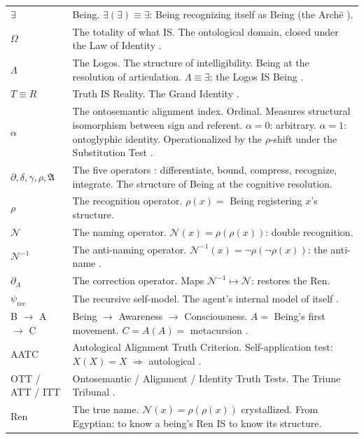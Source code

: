 \documentclass[11pt, oneside]{article}
\theoremstyle{definition}
\begin{document}
{\small
\noindent\begin{tabular}{@{} l @{\hspace{0.3em}} p{} @{}}
$\exists$ & Being. $\exists(\exists) \equiv \exists$: Being recognizing itself as Being (the Arch\={e} \cite{codex1}). \\[0.15em]
$\Omega$ & The totality of what IS. The ontological domain, closed under the Law of Identity \cite{codex1}. \\[0.15em]
$\Lambda$ & The Logos. The structure of intelligibility. Being at the resolution of articulation. $\Lambda \equiv \exists$: the Logos IS Being \cite{codex2}. \\[0.15em]
$T \equiv R$ & Truth IS Reality. The Grand Identity \cite{codex1}. \\[0.15em]
$\alpha$ & The ontosemantic alignment index. Ordinal. Measures structural isomorphism between sign and referent. $\alpha = 0$: arbitrary. $\alpha = 1$: ontoglyphic identity. Operationalized by the $\rho$-shift under the Substitution Test \cite{euphemology}. \\[0.15em]
$\partial, \delta, \gamma, \rho, \mathfrak{A}$ & The five operators \cite{codex1}: differentiate, bound, compress, recognize, integrate. The structure of Being at the cognitive resolution. \\[0.15em]
$\rho$ & The recognition operator. $\rho(x) = $ Being registering $x$'s structure. \\[0.15em]
$\mathcal{N}$ & The naming operator. $\mathcal{N}(x) = \rho(\rho(x))$: double recognition. \\[0.15em]
$\mathcal{N}^{-1}$ & The anti-naming operator. $\mathcal{N}^{-1}(x) = \neg\rho(\neg\rho(x))$: the anti-name \cite{euphemology}. \\[0.15em]
$\partial_\Lambda$ & The correction operator. Maps $\mathcal{N}^{-1} \mapsto \mathcal{N}$: restores the Ren. \\[0.15em]
$\psi_{\text{rec}}$ & The recursive self-model. The agent's internal model of itself \cite{codexmentis}. \\[0.15em]
B $\to$ A $\to$ C & Being $\to$ Awareness $\to$ Consciousness. $A = $ Being's first movement. $C = A(A) = $ metacursion \cite{codex1}. \\[0.15em]
AATC & Autological Alignment Truth Criterion. Self-application test: $X(X) = X$ $\Rightarrow$ autological \cite{codex2}. \\[0.15em]
OTT / ATT / ITT & Ontosemantic / Alignment / Identity Truth Tests. The Triune Tribunal \cite{codex2}. \\[0.15em]
Ren & The true name. $\mathcal{N}(x) = \rho(\rho(x))$ crystallized. From Egyptian: to know a being's Ren IS to know its structure. \\[0.15em]
\end{tabular}
}
\end{document}
